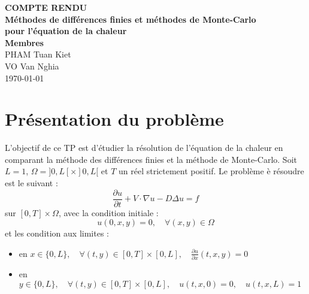 \documentclass[
  11pt,
  dvipsnames]{article}
\author{}
\date{\vspace{-2.5em}}
\providecommand{\tightlist}{%
  \setlength{\itemsep}{0pt}\setlength{\parskip}{0pt}}
\begin{document}
\onehalfspacing


\begin{titlepage}
\vspace*{\fill}
\begin{center}
\LARGE{\textbf{COMPTE RENDU}}\\

\Large{\textbf{Méthodes de différences finies et méthodes de Monte-Carlo}}\\
\Large{\textbf{pour l’équation de la chaleur}}\\
\vspace*{1\baselineskip}
\Large{\textbf{Membres}}\\
PHAM Tuan Kiet\\
VO Van Nghia\\
\vfill %
\vspace*{\fill}
\today
\end{center}
\end{titlepage}

\newpage

\newpage

\newpage
{}

{
\setcounter{tocdepth}{3}
\tableofcontents
}
\newpage

\hypertarget{pruxe9sentation-du-probluxe8me}{%
\section{Présentation du problème}\label{pruxe9sentation-du-probluxe8me}}

L'objectif de ce TP est d'étudier la résolution de l'équation de la chaleur en comparant la méthode des différences finies et la méthode de Monte-Carlo. Soit \(L = 1\), \(\Omega = ]0,L[ \times ]0,L[\) et \(T\) un réel strictement positif. Le problème è résoudre est le suivant :
\[\frac{\partial u}{\partial t} + V \cdot \nabla u - D \Delta u = f\] sur \([0,T] \times \Omega\),
avec la condition initiale :
\[u(0,x,y)=0, \quad \forall (x,y) \in \Omega\]
et les condition aux limites :

\begin{itemize}
\tightlist
\item
  en \(x \in \{0,L\}, \quad \forall (t,y) \in [0,T]\times [0,L], \quad \frac{\partial u}{\partial x}(t,x,y)=0\)
\item
  en \(y \in \{0,L\}, \quad \forall (t,y) \in [0,T]\times [0,L], \quad u(t,x,0)=0, \quad u(t,x,L)=1\)
\end{itemize}
\end{document}
